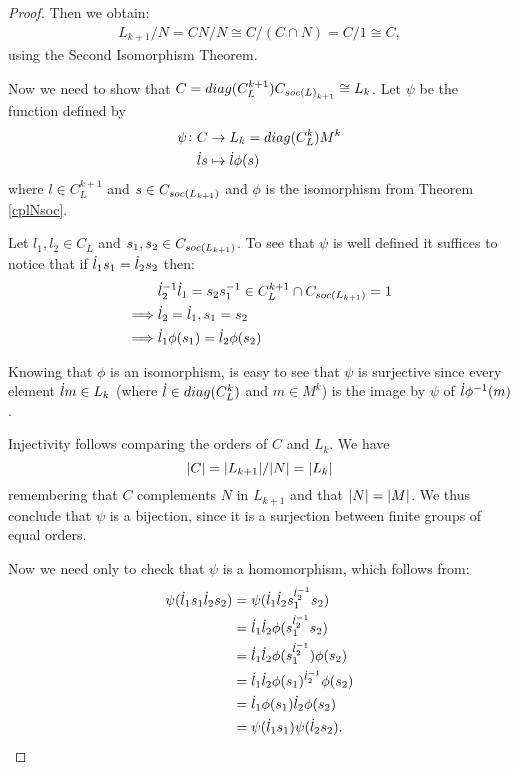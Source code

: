 \begin{proof}
    Then we obtain:
    \begin{align*}
        L_{k+1}/N = CN/N \cong C/(C \cap N) = C/1 \cong C,
    \end{align*}
    using the Second Isomorphism Theorem.

    Now we need to show that $C = diag({C_L^{k+1}})C_{soc {(L)}_{k+1}} \cong L_k$. Let $\psi$ be the function defined by
    \begin{align*}
        \psi \colon C & \rightarrow L_k=diag({C_L^k})M^k \\
                    \dot{l} s &\mapsto \dot{l} \phi(s)
    \end{align*}
    where $l \in C_L^{k+1}$ and $s \in C_{soc {(L_{k+1})}}$ and $\phi$ is the isomorphism from Theorem \ref{cplNsoc}.

    Let $l_1, l_2 \in C_L$ and $s_1, s_2 \in C_{soc {(L_{k+1})}}$.
    To see that $\psi$ is well defined it suffices to notice that if $\dot{l}_1s_1 = \dot{l}_2s_2$ then:
    \begin{align*}
        &\dot{l}_2^{-1}\dot{l}_1 = s_2s_1^{-1} \in C_L^{k+1} \cap C_{soc {(L_{k+1})}} = 1 \\
        \implies & \dot{l}_2 = \dot{l}_1, s_1 = s_2 \\
        \implies & \dot{l}_1\phi(s_1) = \dot{l}_2\phi(s_2)
    \end{align*}

    Knowing that $\phi$ is an isomorphism, is easy to see that $\psi$ is surjective since every element $\dot{l} m \in L_k$ (where $\dot{l} \in diag({C_L^k})$ and $m \in M^k$) is the image by $\psi$ of $\dot{l}\phi^{-1}(m)$.

    Injectivity follows comparing the orders of $C$ and $L_k$. We have
    $$
    | C | = | L_{k+1} | / | N | = | L_k |
    $$
    remembering that $C$ complements $N$ in $L_{k+1}$ and that $| N | = | M |$.
    We thus conclude that $\psi$ is a bijection, since it is a surjection between finite groups of equal orders.

    Now we need only to check that $\psi$ is a homomorphism, which follows from:
    \begin{align*}
        \psi(\dot{l}_1s_1\dot{l}_2s_2) &= 
    \psi(\dot{l}_1\dot{l}_2s_1^{\dot{l}_2^{-1}}s_2)\\
    &= \dot{l}_1\dot{l}_2\phi(s_1^{\dot{l}_2^{-1}}s_2)\\
    &=\dot{l}_1\dot{l}_2\phi(s_1^{\dot{l}_2^{-1}})\phi(s_2)\\
    &=\dot{l}_1\dot{l}_2\phi(s_1)^{\dot{l}_2^{-1}}\phi(s_2)\\
    &=\dot{l}_1\phi(s_1)\dot{l}_2\phi(s_2)\\
    &= \psi(\dot{l}_1s_1)\psi(\dot{l}_2s_2).
    \end{align*}
\end{proof}

